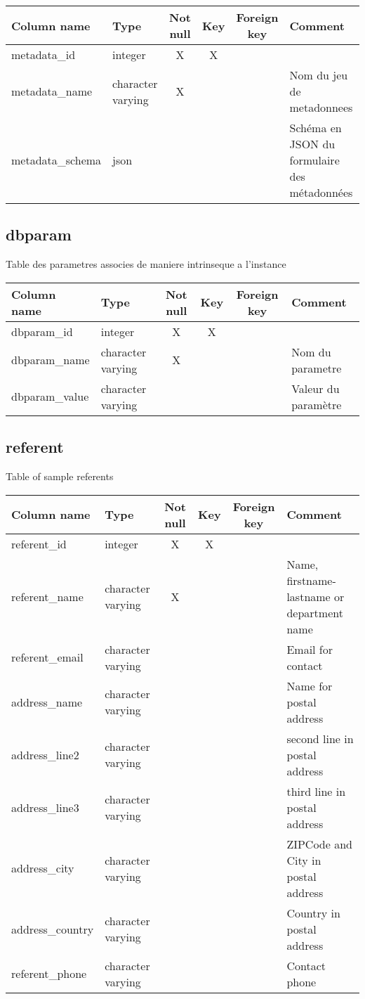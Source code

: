 \begin{tabular}{|l| p{2cm}|c|c|c| p{3cm}|}
\hline
Column name & Type & Not null & Key & Foreign key & Comment \\
\hline
metadata\_id & integer & X & X & & \\
\hline
metadata\_name & character varying & X & & & Nom du jeu de metadonnees\\
\hline
metadata\_schema & json & & & & Schéma en JSON du formulaire des métadonnées\\
\hline
\end{tabular}
\subsection{dbparam}
Table des parametres associes de maniere intrinseque a l'instance

\begin{tabular}{|l| p{2cm}|c|c|c| p{3cm}|}
\hline
Column name & Type & Not null & Key & Foreign key & Comment \\
\hline
dbparam\_id & integer & X & X & & \\
\hline
dbparam\_name & character varying & X & & & Nom du parametre\\
\hline
dbparam\_value & character varying & & & & Valeur du paramètre\\
\hline
\end{tabular}
\subsection{referent}
Table of sample referents

\begin{tabular}{|l| p{2cm}|c|c|c| p{3cm}|}
\hline
Column name & Type & Not null & Key & Foreign key & Comment \\
\hline
referent\_id & integer & X & X & & \\
\hline
referent\_name & character varying & X & & & Name, firstname-lastname or department name\\
\hline
referent\_email & character varying & & & & Email for contact\\
\hline
address\_name & character varying & & & & Name for postal address\\
\hline
address\_line2 & character varying & & & & second line in postal address\\
\hline
address\_line3 & character varying & & & & third line in postal address\\
\hline
address\_city & character varying & & & & ZIPCode and City in postal address\\
\hline
address\_country & character varying & & & & Country in postal address\\
\hline
referent\_phone & character varying & & & & Contact phone\\
\hline
\end{tabular}
